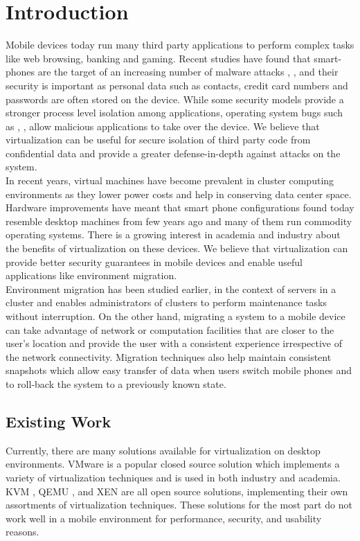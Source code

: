 \section{Introduction}
Mobile devices today run many third party applications to perform complex tasks like web browsing, banking and gaming. Recent studies have found that smart-phones are the target of an increasing number of malware attacks \cite{bose2006mobile},  \cite{cybercriminals2007banks},  \cite{iphone2010seriot} and their security is important as personal data such as contacts, credit card numbers and passwords are often stored on the device. While some security models \cite{androidsecurity} provide a stronger process level isolation among applications, operating system bugs such as \cite{kernel2009vulnerability}, \cite{opencore2009android}, \cite{sms2009iphone} allow malicious applications to take over the device. We believe that virtualization can be useful for secure isolation of third party code from confidential data and provide a greater defense-in-depth against attacks on the system.\\

In recent years, virtual machines have become prevalent in cluster computing environments \cite{gartner2009virtual} as they lower power costs and help in conserving data center space. Hardware improvements have meant that smart phone configurations found today resemble desktop machines from few years ago and many of them run commodity operating systems. There is a growing interest in academia \cite{cox2007pocket} and industry \cite{vmware2009nextfrontier} about the benefits of virtualization on these devices. We believe that virtualization can provide better security guarantees in mobile devices and enable useful applications like environment migration. \\

Environment migration has been studied earlier, in the context of servers in a cluster \cite{clark2005live} and enables administrators of clusters to perform maintenance tasks without interruption. On the other hand, migrating a system to a mobile device can take advantage of network or computation facilities that are closer to the user's location and provide the user with a consistent experience irrespective of the network connectivity. Migration techniques also help maintain consistent snapshots which allow easy transfer of data when users switch mobile phones and to roll-back the system to a previously known state.

\subsection{Existing Work}
Currently, there are many solutions available for virtualization on desktop environments.  VMware is a popular closed source solution which implements a variety of virtualization techniques and is used in both industry and academia.  KVM \cite{kvm}, QEMU \cite{qemu}, and XEN \cite{xen} are all open source solutions, implementing their own assortments of virtualization techniques.  These solutions for the most part do not work well in a mobile environment for performance, security, and usability reasons. \\

